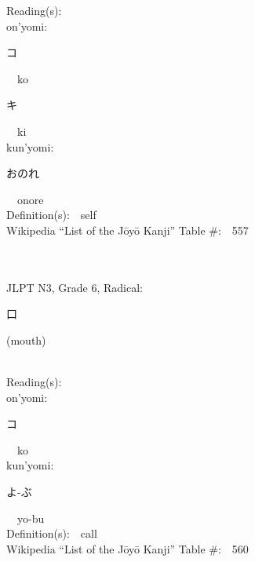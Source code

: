 \begin{multicols}{2}
Reading(s):\ \ \\
{\hspace*{1em}}on'yomi:\ \ \\
{\hspace*{2em}}{\begin{CJK}{UTF8}{min} コ \end{CJK}}\ \ ko\ \ \\
{\hspace*{2em}}{\begin{CJK}{UTF8}{min} キ \end{CJK}}\ \ ki\ \ \\
{\hspace*{1em}}kun'yomi:\ \ \\
{\hspace*{2em}}{\begin{CJK}{UTF8}{min} おのれ \end{CJK}}\ \ onore\ \ \\
Definition(s):\ \ self \\
Wikipedia ``List of the J\=oy\=o Kanji'' Table \#:\ \ 557 \\
\ \ \\
{\fontsize{34pt}{40pt}  }\ \ \\  %
{JLPT N3, Grade 6, Radical:\ \ {\begin{CJK}{UTF8}{min} 口 \end{CJK}} (mouth) } \\
Reading(s):\ \ \\
{\hspace*{1em}}on'yomi:\ \ \\
{\hspace*{2em}}{\begin{CJK}{UTF8}{min} コ \end{CJK}}\ \ ko\ \ \\
{\hspace*{1em}}kun'yomi:\ \ \\
{\hspace*{2em}}{\begin{CJK}{UTF8}{min} よ-ぶ \end{CJK}}\ \ yo-bu\ \ \\
Definition(s):\ \ call \\
Wikipedia ``List of the J\=oy\=o Kanji'' Table \#:\ \ 560 \\
\ \ \\
{\fontsize{34pt}{40pt}  }\ \ \\  %

\end{multicols}

